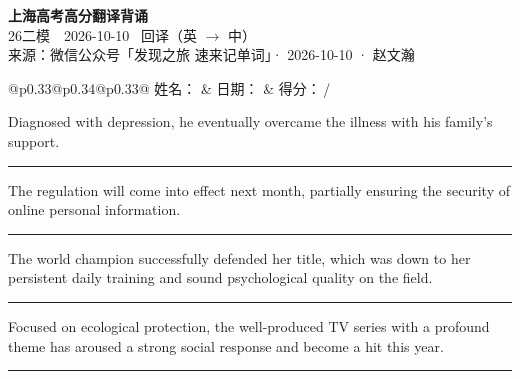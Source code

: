 \documentclass[11pt,a4paper]{article}
\newcommand{\num}[1]{\makebox[1.9em][r]{#1.}\hspace{0.3em}}
\newcommand{\wline}{\noindent\rule{\linewidth}{0.4pt}}
\begin{document}
\pagestyle{plain}
\begin{center}
{\LARGE\bfseries 上海高考高分翻译背诵 }\\[0.25em]
{\large 26二模　2026-10-10 \quad\ 回译（英 $\to$ 中）}\\[0.35em]
{\footnotesize 来源：微信公众号「发现之旅 速来记单词」· 2026-10-10 · 赵文瀚}
\end{center}

\vspace{0.4em}
\noindent\begin{tabular}{@{}p{0.33\textwidth}@{}p{0.34\textwidth}@{}p{0.33\textwidth}@{}}
姓名：\underline{\hspace{2.0cm}} & 日期：\underline{\hspace{2.0cm}} & 得分：\underline{\hspace{1.4cm}}\,/ \\
\end{tabular}

\vspace{0.5em}

\vspace{0.8em}
\num{1}Diagnosed with depression, he eventually overcame the illness with his family’s support.

\vspace{0.25em}

\wline

\num{2}The regulation will come into effect next month, partially ensuring the security of online personal information.

\vspace{0.25em}

\wline

\num{3}The world champion successfully defended her title, which was down to her persistent daily training and sound psychological quality on the field.

\vspace{0.25em}

\wline

\num{4}Focused on ecological protection, the well-produced TV series with a profound theme has aroused a strong social response and become a hit this year.

\vspace{0.25em}

\wline
\end{document}
